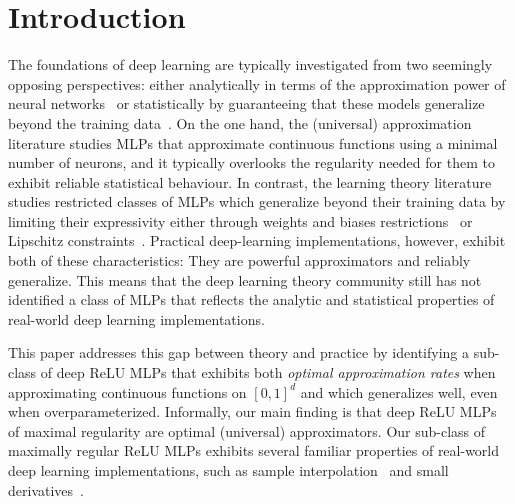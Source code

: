 \documentclass{article}
\numberwithin{equation}{section}
\theoremstyle{definition}
\begin{document}



\section{Introduction}
\label{s:Intro}

The foundations of deep learning are typically investigated from two seemingly opposing perspectives: either analytically in terms of the approximation power of neural networks~\cite{yarotsky2017error,petersen2018optimal,elbrachter2021deep,ShenYangZhang_JMPA_OptApprx_ReLU,siegel2023optimal} or statistically by guaranteeing that these models generalize beyond the training data~\cite{bartlett2017spectrally,BartlettHarveyChristopherMehrabian_VCDimReLUMLPs_JMLR_2019}.  
On the one hand, the (universal) approximation literature studies MLPs that approximate continuous functions using a minimal number of neurons, and it typically overlooks the regularity needed for them to exhibit reliable statistical behaviour.  
In contrast, the learning theory literature studies restricted classes of MLPs which generalize beyond their training data by limiting their expressivity either through weights and biases restrictions~\cite{neyshabur2015pathSGD_NIPS,miyato2018spectral,virmaux2018lipschitz} or Lipschitz constraints~\cite{gouk2021regularisation}.
Practical deep-learning implementations, however, exhibit both of these characteristics: They are powerful approximators and reliably generalize. This means that the deep learning theory community still has not identified a class of MLPs that reflects the analytic and statistical properties of real-world deep learning implementations.  


This paper addresses this gap between theory and practice by identifying a sub-class of deep ReLU MLPs that exhibits both \textit{optimal approximation rates} when approximating continuous functions on $[0,1]^d$ and which generalizes well, even when overparameterized.
Informally, our main finding is that deep ReLU MLPs of maximal regularity are optimal (universal) approximators.
Our sub-class of maximally regular ReLU MLPs exhibits several familiar properties of real-world deep learning implementations, such as sample interpolation~\cite{jin2023implicit,taheri2024generalization} and small derivatives~\cite{mulayoff2021implicit,heiss2023implicit}.

\end{document}
